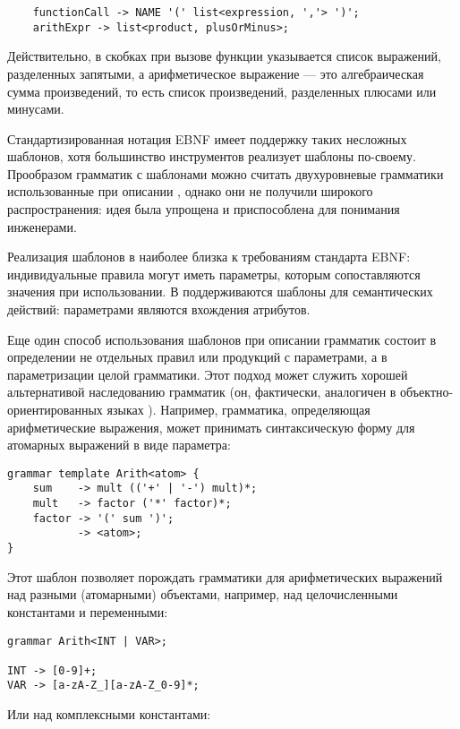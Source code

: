 \begin{lstlisting}
	functionCall -> NAME '(' list<expression, ','> ')';
	arithExpr -> list<product, plusOrMinus>;
\end{lstlisting}

Действительно, в скобках при вызове функции указывается список выражений, разделенных запятыми, а арифметическое выражение --- это алгебраическая сумма произведений, то есть список произведений, разделенных плюсами или минусами.

Стандартизированная нотация EBNF \cite{???} имеет поддержку таких несложных шаблонов, хотя большинство инструментов реализует шаблоны по-своему. Прообразом грамматик с шаблонами можно считать двухуровневые грамматики \cite{???} использованные при описании  \cite{???}, однако они не получили широкого распространения: идея была упрощена и приспособлена для понимания инженерами.

Реализация шаблонов в  наиболее близка к требованиям стандарта EBNF: индивидуальные правила могут иметь параметры, которым сопоставляются значения при использовании. В  поддерживаются шаблоны для семантических действий: параметрами являются вхождения атрибутов.

Еще один способ использования шаблонов при описании грамматик состоит в определении не отдельных правил или продукций с параметрами, а в параметризации целой грамматики. Этот подход может служить хорошей альтернативой наследованию грамматик (он, фактически, аналогичен  в объектно-ориентированных языках \cite{???}). Например, грамматика, определяющая арифметические выражения, может принимать синтаксическую форму для атомарных выражений в виде параметра:

\begin{lstlisting}
grammar template Arith<atom> {
	sum    -> mult (('+' | '-') mult)*;
	mult   -> factor ('*' factor)*;
	factor -> '(' sum ')';
	       -> <atom>;
}
\end{lstlisting}

Этот шаблон позволяет порождать грамматики для арифметических выражений над разными (атомарными) объектами, например, над целочисленными константами и переменными:

\begin{lstlisting}
grammar Arith<INT | VAR>;

INT -> [0-9]+;
VAR -> [a-zA-Z_][a-zA-Z_0-9]*;
\end{lstlisting}

Или над комплексными константами:

